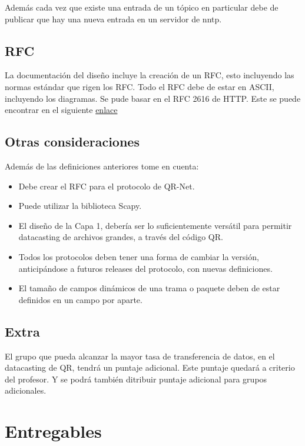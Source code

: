 \documentclass{article}
\providecommand{\tightlist}{%
          \setlength{\itemsep}{0pt}\setlength{\parskip}{0pt}}
\begin{document}
Además cada vez que existe una entrada de un tópico en particular debe
de publicar que hay una nueva entrada en un servidor de nntp.

\subsection{RFC}\label{rfc}

La documentación del diseño incluye la creación de un RFC, esto
incluyendo las normas estándar que rigen los RFC. Todo el RFC debe de
estar en ASCII, incluyendo los diagramas. Se pude basar en el RFC 2616
de HTTP. Este se puede encontrar en el siguiente
\href{http://www.w3.org/Protocols/rfc2616/rfc2616.txt}{enlace}

\subsection{Otras consideraciones}\label{otras-consideraciones}

Además de las definiciones anteriores tome en cuenta:

\begin{itemize}
\tightlist
\item
  Debe crear el RFC para el protocolo de QR-Net.
\item
  Puede utilizar la biblioteca Scapy.
\item
  El diseño de la Capa 1, debería ser lo suficientemente versátil para
  permitir datacasting de archivos grandes, a través del código QR.
\item
  Todos los protocolos deben tener una forma de cambiar la versión,
  anticipándose a futuros releases del protocolo, con nuevas
  definiciones.
\item
  El tamaño de campos dinámicos de una trama o paquete deben de estar
  definidos en un campo por aparte.
\end{itemize}

\subsection{Extra}\label{extra}

El grupo que pueda alcanzar la mayor tasa de transferencia de datos, en
el datacasting de QR, tendrá un puntaje adicional. Este puntaje quedará
a criterio del profesor. Y se podrá también ditribuir puntaje adicional
para grupos adicionales.

\section{Entregables}\label{entregables}
\end{document}
